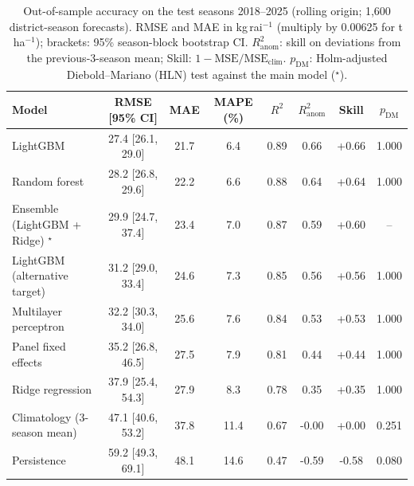 \begin{table}[t]\centering\scriptsize
\caption{Out-of-sample accuracy on the test seasons 2018--2025 (rolling origin; 1{,}600 district-season forecasts). RMSE and MAE in kg\,rai$^{-1}$ (multiply by 0.00625 for t\,ha$^{-1}$); brackets: 95\% season-block bootstrap CI. $R^2_{\mathrm{anom}}$: skill on deviations from the previous-3-season mean; Skill: $1-\mathrm{MSE}/\mathrm{MSE}_{\mathrm{clim}}$. $p_{\mathrm{DM}}$: Holm-adjusted Diebold--Mariano (HLN) test against the main model ($^{\star}$).}\label{tab:models}
\begin{tabular}{@{}lccccccc@{}}
\toprule
Model & RMSE [95\% CI] & MAE & MAPE (\%) & $R^2$ & $R^2_{\mathrm{anom}}$ & Skill & $p_{\mathrm{DM}}$ \\
\midrule
LightGBM & 27.4 [26.1, 29.0] & 21.7 & 6.4 & 0.89 & 0.66 & +0.66 & 1.000 \\
Random forest & 28.2 [26.8, 29.6] & 22.2 & 6.6 & 0.88 & 0.64 & +0.64 & 1.000 \\
Ensemble (LightGBM + Ridge) $^{\star}$ & 29.9 [24.7, 37.4] & 23.4 & 7.0 & 0.87 & 0.59 & +0.60 & -- \\
LightGBM (alternative target) & 31.2 [29.0, 33.4] & 24.6 & 7.3 & 0.85 & 0.56 & +0.56 & 1.000 \\
Multilayer perceptron & 32.2 [30.3, 34.0] & 25.6 & 7.6 & 0.84 & 0.53 & +0.53 & 1.000 \\
Panel fixed effects & 35.2 [26.8, 46.5] & 27.5 & 7.9 & 0.81 & 0.44 & +0.44 & 1.000 \\
Ridge regression & 37.9 [25.4, 54.3] & 27.9 & 8.3 & 0.78 & 0.35 & +0.35 & 1.000 \\
Climatology (3-season mean) & 47.1 [40.6, 53.2] & 37.8 & 11.4 & 0.67 & -0.00 & +0.00 & 0.251 \\
Persistence & 59.2 [49.3, 69.1] & 48.1 & 14.6 & 0.47 & -0.59 & -0.58 & 0.080 \\
\bottomrule
\end{tabular}
\end{table}